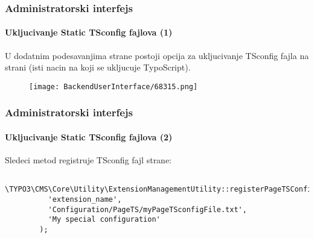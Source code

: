 \begin{frame}[fragile]
	\frametitle{Administratorski interfejs}
	\framesubtitle{Ukljucivanje Static TSconfig fajlova (1)}

	U dodatnim podesavanjima strane postoji opcija za ukljucivanje TSconfig fajla na strani (isti nacin na koji se ukljucuje TypoScript).

	\begin{figure}
		\texttt{[image: BackendUserInterface/68315.png]}
	\end{figure}

\end{frame}

\begin{frame}[fragile]
	\frametitle{Administratorski interfejs}
	\framesubtitle{Ukljucivanje Static TSconfig fajlova (2)}

	\lstset{basicstyle=\tiny\ttfamily}

	Sledeci metod registruje TSconfig fajl strane:

	\begin{lstlisting}
		\TYPO3\CMS\Core\Utility\ExtensionManagementUtility::registerPageTSConfigFile(
		  'extension_name',
		  'Configuration/PageTS/myPageTSconfigFile.txt',
		  'My special configuration'
		);
	\end{lstlisting}

\end{frame}

